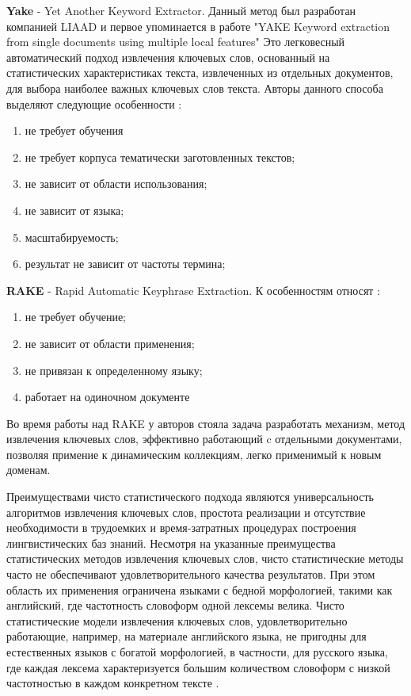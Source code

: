 \textbf{Yake} - Yet Another Keyword Extractor.
Данный метод был разработан компанией LIAAD и первое упоминается в работе "YAKE Keyword extraction from single documents using multiple local features" \cite{14}
Это легковесный автоматический подход извлечения ключевых слов, основанный на статистических характеристиках текста, извлеченных из отдельных документов, для выбора наиболее важных ключевых слов текста. 
Авторы данного способа выделяют следующие особенности \cite{14}:
\begin{enumerate}
	\item не требует обучения
	\item не требует корпуса тематически заготовленных текстов;
	\item не зависит от области использования;
	\item не зависит от языка;
	\item масштабируемость;
	\item результат не зависит от частоты термина;
\end{enumerate}

\textbf{RAKE} - Rapid Automatic Keyphrase Extraction.
К особенностям относят \cite{15}:
\begin{enumerate}
	\item не требует обучение;
	\item не зависит от области применения;
	\item не привязан к определенному языку;
	\item работает на одиночном документе
\end{enumerate}
Во время работы над RAKE у авторов стояла задача разработать механизм, метод извлечения ключевых слов, эффективно работающий c отдельными документами, позволяя примение к динамическим коллекциям, легко применимый к новым доменам.

Преимуществами чисто статистического подхода являются универсальность алгоритмов извлечения ключевых слов, простота реализации и отсутствие необходимости в трудоемких и время-затратных процедурах построения лингвистических баз знаний.
Несмотря на указанные преимущества статистических методов извлечения ключевых слов, чисто статистические методы часто не обеспечивают удовлетворительного качества результатов. 
При этом область их применения ограничена языками с бедной морфологией, такими как английский, где частотность словоформ одной лексемы велика. 
Чисто статистические модели извлечения ключевых слов, удовлетворительно работающие, например, на материале английского языка, не пригодны для естественных языков с богатой морфологией, в частности, для русского языка, где каждая лексема характеризуется большим количеством словоформ с низкой частотностью в каждом конкретном тексте \cite{9}.

